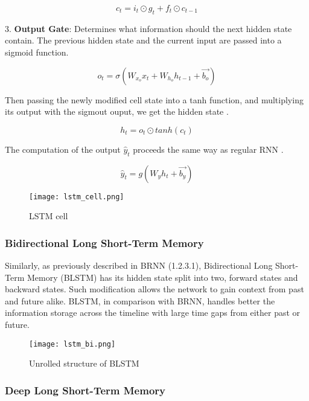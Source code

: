 \begin{equation}
    {c_t = i_t \odot g_t + f_t \odot c_{t-1}}
\end{equation}


3. \textbf{Output Gate}: Determines what information should the next hidden state contain. The previous hidden state and the current input are passed into a sigmoid function.

\begin{equation}
    {o_t = \sigma(W_{x_o}x_t + W_{h_o}h_{t-1}+\vec{b_o})}
\end{equation}

Then passing the newly modified cell state into a tanh function, and multiplying its output with the sigmout ouput, we get the hidden state \cite{guideLSTM}.

\begin{equation}
    {h_t = o_t \odot tanh(c_t)}
\end{equation}


The computation of the output $\hat{y}_t$ proceeds the same way as regular RNN \cite{matous}.

\begin{equation}
    {\hat{y}_t = g(W_{y}h_t + \vec{b_y})}
\end{equation}

\begin{figure}[h]
	\centering
    \texttt{[image: lstm\_cell.png]}
	\caption{LSTM cell \cite{lstmcell_img}}
	\label{fig:lstmCell}
\end{figure}

\subsubsection{Bidirectional Long Short-Term Memory}

Similarly, as previously described in BRNN (1.2.3.1), Bidirectional Long Short-Term Memory (BLSTM) has its hidden state split into two, forward states and backward states. Such modification allows the network to gain context from past and future alike. BLSTM, in comparison with BRNN, handles better the information storage across the timeline with large time gaps from either past or future.

\begin{figure}[h]
	\centering
    \texttt{[image: lstm\_bi.png]}
	\caption{Unrolled structure of BLSTM \cite{matous}}
	\label{fig:blstm}
\end{figure}

\subsubsection{Deep Long Short-Term Memory}

